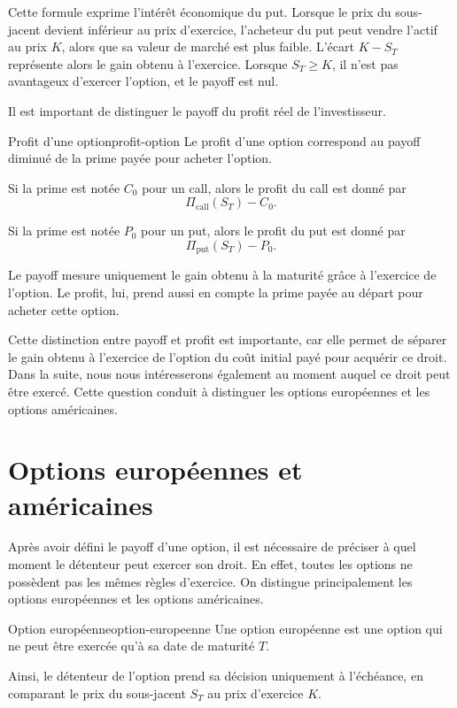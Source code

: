 \documentclass[12pt,a4paper]{report}
\begin{document}
Cette formule exprime l'intérêt économique du put. Lorsque le prix du sous-jacent devient inférieur au prix d'exercice, l'acheteur du put peut vendre l'actif au prix $K$, alors que sa valeur de marché est plus faible. L'écart $K - S_T$ représente alors le gain obtenu à l'exercice. Lorsque $S_T \geq K$, il n'est pas avantageux d'exercer l'option, et le payoff est nul.

Il est important de distinguer le payoff du profit réel de l'investisseur.

\begin{definition}{Profit d'une option}{profit-option}
Le profit d'une option correspond au payoff diminué de la prime payée pour acheter l'option.

Si la prime est notée $C_0$ pour un call, alors le profit du call est donné par
\[
\Pi_{\text{call}}(S_T) - C_0.
\]

Si la prime est notée $P_0$ pour un put, alors le profit du put est donné par
\[
\Pi_{\text{put}}(S_T) - P_0.
\]
\end{definition}

Le payoff mesure uniquement le gain obtenu à la maturité grâce à l'exercice de l'option. Le profit, lui, prend aussi en compte la prime payée au départ pour acheter cette option.

Cette distinction entre payoff et profit est importante, car elle permet de séparer le gain obtenu à l'exercice de l'option du coût initial payé pour acquérir ce droit. Dans la suite, nous nous intéresserons également au moment auquel ce droit peut être exercé. Cette question conduit à distinguer les options européennes et les options américaines.

\section{Options européennes et américaines}

Après avoir défini le payoff d'une option, il est nécessaire de préciser à quel moment le détenteur peut exercer son droit. En effet, toutes les options ne possèdent pas les mêmes règles d'exercice. On distingue principalement les options européennes et les options américaines.

\begin{definition}{Option européenne}{option-europeenne}
Une option européenne est une option qui ne peut être exercée qu'à sa date de maturité $T$.

Ainsi, le détenteur de l'option prend sa décision uniquement à l'échéance, en comparant le prix du sous-jacent $S_T$ au prix d'exercice $K$.
\end{definition}
\end{document}
